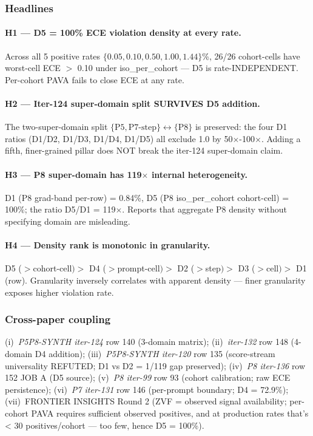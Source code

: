 \documentclass{article}
\begin{document}
\subsubsection{Headlines}

\paragraph{H1 --- D5 = 100\% ECE violation density at every rate.}
Across all 5 positive rates $\{0.05, 0.10, 0.50, 1.00, 1.44\}$\%, 26/26 cohort-cells
have worst-cell ECE $>$ 0.10 under iso\_per\_cohort --- D5 is rate-INDEPENDENT.
Per-cohort PAVA fails to close ECE at any rate.

\paragraph{H2 --- Iter-124 super-domain split SURVIVES D5 addition.} The two-super-domain
split $\{\text{P5}, \text{P7-step}\} \leftrightarrow \{\text{P8}\}$ is preserved:
the four D1 ratios (D1/D2, D1/D3, D1/D4, D1/D5) all exclude 1.0 by 50$\times$-100$\times$.
Adding a fifth, finer-grained pillar does NOT break the iter-124 super-domain claim.

\paragraph{H3 --- P8 super-domain has 119$\times$ internal heterogeneity.} D1 (P8 grad-band
per-row) = 0.84\%, D5 (P8 iso\_per\_cohort cohort-cell) = 100\%; the ratio D5/D1 = 119$\times$.
Reports that aggregate P8 density without specifying domain are misleading.

\paragraph{H4 --- Density rank is monotonic in granularity.} D5 ($>$cohort-cell$) >$ D4
($>$prompt-cell$) >$ D2 ($>$step$) >$ D3 ($>$cell$) >$ D1 (row). Granularity inversely
correlates with apparent density --- finer granularity exposes higher violation rate.

\subsubsection{Cross-paper coupling}

(i)~\textit{P5P8-SYNTH iter-124} row 140 (3-domain matrix); (ii)~\textit{iter-132} row 148 (4-domain
D4 addition); (iii)~\textit{P5P8-SYNTH iter-120} row 135 (score-stream universality REFUTED;
D1 vs D2 = 1/119 gap preserved); (iv)~\textit{P8 iter-136} row 152 JOB A (D5 source); (v)~\textit{P8
iter-99} row 93 (cohort calibration; raw ECE persistence); (vi)~\textit{P7 iter-131} row 146
(per-prompt boundary; D4 = 72.9\%); (vii)~FRONTIER INSIGHTS Round 2 (ZVF = observed signal
availability; per-cohort PAVA requires sufficient observed positives, and at production rates
that's < 30 positives/cohort --- too few, hence D5 = 100\%).
\end{document}
